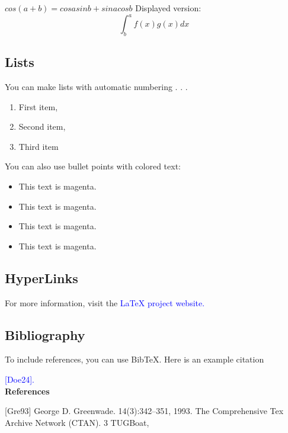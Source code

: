 \documentclass{article}
\begin{document}
 $cos(a + b) = cosasinb + sinacosb $
 Displayed version:
 $$\int^a_bf(x)g(x)dx  $$
 \flushleft\subsection{Lists}
 You can make lists with automatic numbering . . .

 \begin{enumerate}
 	\item First item,
 		\item Second item,
 			\item Third item
 \end{enumerate}
You can also use bullet points with colored text:
\begin{itemize}
	\item \color{magenta} This text is magenta.
		\item \color{yellow} This text is magenta.
			\item \color{black} This text is magenta.
				\item \color{gray} This text is magenta.
			\end{itemize}
\subsection{HyperLinks}
For more information, visit the \textcolor{blue}{LaTeX project website.}\\
\subsection{Bibliography}
To include references, you can use BibTeX. Here is an example citation 

  \textcolor{blue}{[Doe24].}\\
  	\vspace{1cm}
\huge\textbf{References}
	
\small[Gre93] George D. Greenwade. 14(3):342–351, 1993. The Comprehensive Tex
Archive Network (CTAN). 3 TUGBoat,
\end{document}
